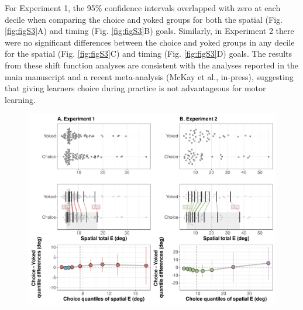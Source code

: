 \documentclass[
  man, donotrepeattitle,floatsintext]{apa7}
\begin{document}
For Experiment 1, the 95\% confidence intervals overlapped with zero at each decile when comparing the choice and yoked groups for both the spatial (Fig. \ref{fig:figS3}A) and timing (Fig. \ref{fig:figS3}B) goals. Similarly, in Experiment 2 there were no significant differences between the choice and yoked groups in any decile for the spatial (Fig. \ref{fig:figS3}C) and timing (Fig. \ref{fig:figS3}D) goals. The results from these shift function analyses are consistent with the analyses reported in the main manuscript and a recent meta-analysis (McKay et al., in-press), suggesting that giving learners choice during practice is not advantageous for motor learning.

\begin{figure}

{\centering \includegraphics{../../figs/figS3} 

}


\end{figure}
\end{document}

